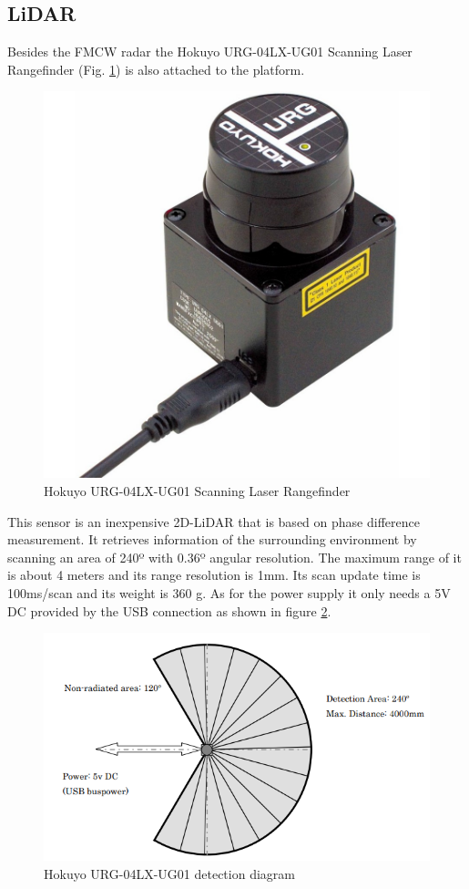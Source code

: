 \subsection{LiDAR}
Besides the \ac{FMCW} \ac{radar} the Hokuyo URG-04LX-UG01 Scanning Laser Rangefinder (Fig. \ref{fig:lidar}) is also attached to the platform.

\begin{figure}[h] 
\centerline{\includegraphics [width=0.5 \textwidth]{imgs/chapter4/lidar.jpg}}
\caption{Hokuyo URG-04LX-UG01 Scanning Laser Rangefinder}
\label{fig:lidar}
\end{figure}

This sensor is an inexpensive 2D-\ac{LiDAR} that is based on phase difference measurement. It retrieves information of the surrounding environment by scanning an area of 240º with 0.36º angular resolution. The maximum range of it is about 4 meters and its range resolution is 1mm. Its scan update time is 100ms/scan and its weight is 360 g.  As for the power supply it only needs a 5V DC provided by the USB connection as shown in figure \ref{fig:lidarS}.



\begin{figure}[h] 
\centerline{\includegraphics [width=0.6 \textwidth]{imgs/chapter4/lidarS.png}}
\caption{Hokuyo URG-04LX-UG01 detection diagram}
\label{fig:lidarS}
\end{figure}

